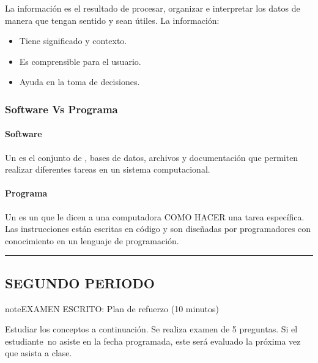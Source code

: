 \documentclass[letterpaper,10pt,spanish]{sphinxmanual}
\begin{document}
\sphinxAtStartPar
La información es el resultado de procesar, organizar e interpretar los datos de manera que tengan sentido y sean útiles. La información:
\begin{itemize}
\item {} 
\sphinxAtStartPar
Tiene significado y contexto.

\item {} 
\sphinxAtStartPar
Es comprensible para el usuario.

\item {} 
\sphinxAtStartPar
Ayuda en la toma de decisiones.

\end{itemize}


\subsubsection{Software Vs Programa}
\label{\detokenize{1_guias/10programacion/G1029:software-vs-programa}}

\paragraph{Software}
\label{\detokenize{1_guias/10programacion/G1029:id1}}
\sphinxAtStartPar
Un  es el conjunto de , bases de datos, archivos y documentación que permiten realizar diferentes tareas en un sistema computacional.


\paragraph{Programa}
\label{\detokenize{1_guias/10programacion/G1029:programa}}
\sphinxAtStartPar
Un  es un  que le dicen a una computadora COMO HACER una tarea específica. Las instrucciones están escritas en código y son diseñadas por programadores con conocimiento en un lenguaje de programación.


\bigskip\hrule\bigskip



\subsection{SEGUNDO PERIODO}
\label{\detokenize{1_guias/10programacion/G1029:segundo-periodo}}
\begin{sphinxadmonition}{note}{EXAMEN ESCRITO: Plan de refuerzo (10 minutos)}

\sphinxAtStartPar
Estudiar los conceptos a continuación. Se realiza examen de 5 preguntas. Si el estudiante no asiste en la fecha programada, este será evaluado la próxima vez que asista a clase.
\end{sphinxadmonition}
\end{document}
